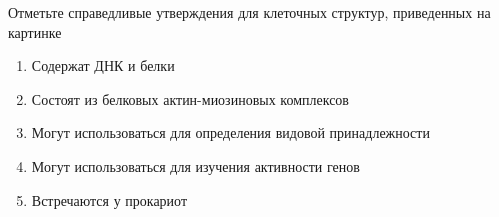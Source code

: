 
Отметьте справедливые утверждения для клеточных структур, приведенных на
картинке


\begin{enumerate}
    \item Содержат ДНК и белки
    \item Состоят из белковых актин-миозиновых комплексов 
    \item Могут использоваться для определения видовой принадлежности
    \item Могут использоваться для изучения активности генов
    \item Встречаются у прокариот
\end{enumerate}

\explanationSection


